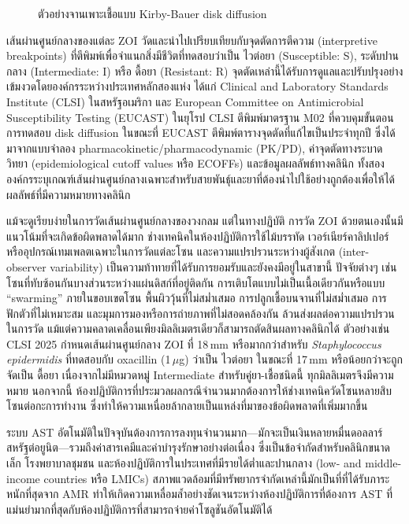 \begin{figure}[H]
  \centering
  \caption{ตัวอย่างจานเพาะเชื้อแบบ Kirby-Bauer disk diffusion \cite{asm2009kirby}}
  \label{fig:kirby_bauer}
\end{figure}

เส้นผ่านศูนย์กลางของแต่ละ ZOI วัดและนำไปเปรียบเทียบกับจุดตัดการตีความ (interpretive breakpoints) ที่ตีพิมพ์เพื่อจำแนกสิ่งมีชีวิตที่ทดสอบว่าเป็น ไวต่อยา (Susceptible: S), ระดับปานกลาง (Intermediate: I) หรือ ดื้อยา (Resistant: R) จุดตัดเหล่านี้ได้รับการดูแลและปรับปรุงอย่างเข้มงวดโดยองค์กรระหว่างประเทศหลักสองแห่ง ได้แก่ Clinical and Laboratory Standards Institute (CLSI) ในสหรัฐอเมริกา และ European Committee on Antimicrobial Susceptibility Testing (EUCAST) ในยุโรป \cite{eucast2023} CLSI ตีพิมพ์มาตรฐาน M02 ที่ควบคุมขั้นตอนการทดสอบ disk diffusion ในขณะที่ EUCAST ตีพิมพ์ตารางจุดตัดที่แก้ไขเป็นประจำทุกปี ซึ่งได้มาจากแบบจำลอง pharmacokinetic/pharmacodynamic (PK/PD), ค่าจุดตัดทางระบาดวิทยา (epidemiological cutoff values หรือ ECOFFs) และข้อมูลผลลัพธ์ทางคลินิก \cite{giske2022} ทั้งสององค์กรระบุเกณฑ์เส้นผ่านศูนย์กลางเฉพาะสำหรับสายพันธุ์และยาที่ต้องนำไปใช้อย่างถูกต้องเพื่อให้ได้ผลลัพธ์ที่มีความหมายทางคลินิก

แม้จะดูเรียบง่ายในการวัดเส้นผ่านศูนย์กลางของวงกลม แต่ในทางปฏิบัติ การวัด ZOI ด้วยตนเองนั้นมีแนวโน้มที่จะเกิดข้อผิดพลาดได้มาก ช่างเทคนิคในห้องปฏิบัติการใช้ไม้บรรทัด เวอร์เนียร์คาลิปเปอร์ หรืออุปกรณ์เทมเพลตเฉพาะในการวัดแต่ละโซน และความแปรปรวนระหว่างผู้สังเกต (inter-observer variability) เป็นความท้าทายที่ได้รับการยอมรับและยังคงมีอยู่ในสาขานี้ \cite{humphries2018} ปัจจัยต่างๆ เช่น โซนที่ทับซ้อนกันบางส่วนระหว่างแผ่นดิสก์ที่อยู่ติดกัน การเติบโตแบบไม่เป็นเนื้อเดียวกันหรือแบบ ``swarming'' ภายในขอบเขตโซน พื้นผิววุ้นที่ไม่สม่ำเสมอ การปลูกเชื้อบนจานที่ไม่สม่ำเสมอ การฟักตัวที่ไม่เหมาะสม และมุมการมองหรือการถ่ายภาพที่ไม่สอดคล้องกัน ล้วนส่งผลต่อความแปรปรวนในการวัด แม้แต่ความคลาดเคลื่อนเพียงมิลลิเมตรเดียวก็สามารถตัดสินผลทางคลินิกได้ ตัวอย่างเช่น CLSI 2025 กำหนดเส้นผ่านศูนย์กลาง ZOI ที่ 18\,mm หรือมากกว่าสำหรับ \textit{Staphylococcus epidermidis} ที่ทดสอบกับ oxacillin (1\,$\mu$g) ว่าเป็น ไวต่อยา ในขณะที่ 17\,mm หรือน้อยกว่าจะถูกจัดเป็น ดื้อยา เนื่องจากไม่มีหมวดหมู่ Intermediate สำหรับคู่ยา-เชื้อชนิดนี้ ทุกมิลลิเมตรจึงมีความหมาย นอกจากนี้ ห้องปฏิบัติการที่ประมวลผลกรณีจำนวนมากต้องการให้ช่างเทคนิควัดโซนหลายสิบโซนต่อกะการทำงาน ซึ่งทำให้ความเหนื่อยล้ากลายเป็นแหล่งที่มาของข้อผิดพลาดที่เพิ่มมากขึ้น

ระบบ AST อัตโนมัติในปัจจุบันต้องการการลงทุนจำนวนมาก---มักจะเป็นเงินหลายหมื่นดอลลาร์สหรัฐต่อยูนิต---รวมถึงค่าสารเคมีและค่าบำรุงรักษาอย่างต่อเนื่อง ซึ่งเป็นข้อจำกัดสำหรับคลินิกขนาดเล็ก โรงพยาบาลชุมชน และห้องปฏิบัติการในประเทศที่มีรายได้ต่ำและปานกลาง (low- and middle-income countries หรือ LMICs) สภาพแวดล้อมที่มีทรัพยากรจำกัดเหล่านี้มักเป็นที่ที่ได้รับภาระหนักที่สุดจาก AMR ทำให้เกิดความเหลื่อมล้ำอย่างชัดเจนระหว่างห้องปฏิบัติการที่ต้องการ AST ที่แม่นยำมากที่สุดกับห้องปฏิบัติการที่สามารถจ่ายค่าโซลูชันอัตโนมัติได้

